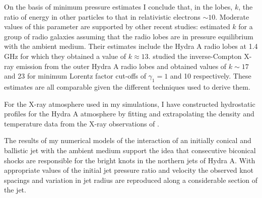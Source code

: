 On the basis of minimum pressure estimates I conclude that, in the lobes, $k$, the ratio of energy in other particles to that in relativistic electrons $\sim 10$. Moderate values of this parameter are supported by other recent studies: \citet{birzan08} estimated $k$ for a group of radio galaxies assuming that the radio lobes are in pressure equilibrium with the ambient medium. Their estimates include the Hydra A radio lobes at 1.4 GHz for which they obtained a value of $k \approx 13$. \citet{hardcastle10} studied the inverse-Compton X-ray emission from the outer Hydra A radio lobes and obtained values of $k \sim 17$ and 23 for minimum Lorentz factor cut-offs of $\gamma_1=1$ and 10 respectively. These estimates are all comparable given the different techniques used to derive them. 

For the X-ray atmosphere used in my simulations, I have constructed hydrostatic profiles for the Hydra A atmosphere by fitting and extrapolating the density and temperature data from the X-ray observations of \citet{david01}.

The results of my numerical models of the interaction of an initially conical and ballistic jet with the ambient medium support the idea that consecutive biconical shocks are responsible for the bright knots in the northern jets of Hydra A. With appropriate values of the initial jet pressure ratio and velocity the observed knot spacings and variation in jet radius are reproduced along a considerable section of the jet. 


